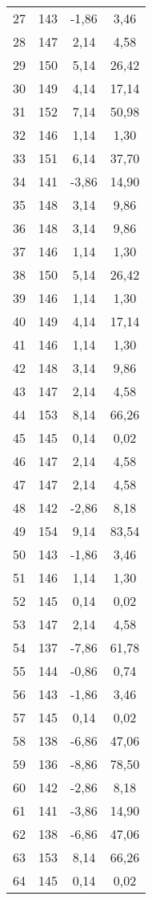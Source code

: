 \begin{xltabular}{\textwidth}{|c|c|c|c|}
27  & 143 & -1,86 & 3,46  \\
28  & 147 & 2,14  & 4,58  \\
29  & 150 & 5,14  & 26,42 \\
30  & 149 & 4,14  & 17,14 \\
31  & 152 & 7,14  & 50,98 \\
32  & 146 & 1,14  & 1,30  \\
33  & 151 & 6,14  & 37,70 \\
34  & 141 & -3,86 & 14,90 \\
35  & 148 & 3,14  & 9,86  \\
36  & 148 & 3,14  & 9,86  \\
37  & 146 & 1,14  & 1,30  \\
38  & 150 & 5,14  & 26,42 \\
39  & 146 & 1,14  & 1,30  \\
40  & 149 & 4,14  & 17,14 \\
41  & 146 & 1,14  & 1,30  \\
42  & 148 & 3,14  & 9,86  \\
43  & 147 & 2,14  & 4,58  \\
44  & 153 & 8,14  & 66,26 \\
45  & 145 & 0,14  & 0,02  \\
46  & 147 & 2,14  & 4,58  \\
47  & 147 & 2,14  & 4,58  \\
48  & 142 & -2,86 & 8,18  \\
49  & 154 & 9,14  & 83,54 \\
50  & 143 & -1,86 & 3,46  \\
51  & 146 & 1,14  & 1,30  \\
52  & 145 & 0,14  & 0,02  \\
53  & 147 & 2,14  & 4,58  \\
54  & 137 & -7,86 & 61,78 \\
55  & 144 & -0,86 & 0,74  \\
56  & 143 & -1,86 & 3,46  \\
57  & 145 & 0,14  & 0,02  \\
58  & 138 & -6,86 & 47,06 \\
59  & 136 & -8,86 & 78,50 \\
60  & 142 & -2,86 & 8,18  \\
61  & 141 & -3,86 & 14,90 \\
62  & 138 & -6,86 & 47,06 \\
63  & 153 & 8,14  & 66,26 \\
64  & 145 & 0,14  & 0,02  \\

\end{xltabular}
